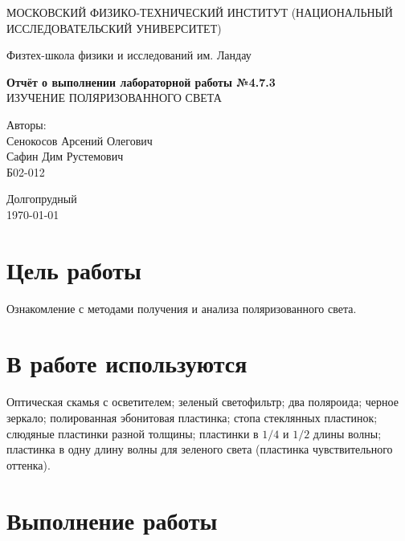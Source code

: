 \documentclass[a4paper,12pt]{article} %
\date{\today}
\begin{document}
\begin{titlepage}
	\begin{center}
		{\large МОСКОВСКИЙ ФИЗИКО-ТЕХНИЧЕСКИЙ ИНСТИТУТ (НАЦИОНАЛЬНЫЙ ИССЛЕДОВАТЕЛЬСКИЙ УНИВЕРСИТЕТ)}
	\end{center}
	\begin{center}
		{\large Физтех-школа физики и исследований им. Ландау}
	\end{center}
	
	
	\vspace{4.5cm}
	{\huge
		\begin{center}
			{\bf Отчёт о выполнении лабораторной работы №4.7.3}\\
			ИЗУЧЕНИЕ ПОЛЯРИЗОВАННОГО СВЕТА
		\end{center}
	}
	\vspace{2cm}
	\begin{flushright}
		{\LARGE Авторы:\\ Сенокосов Арсений Олегович \\ Сафин Дим Рустемович \\
			\vspace{0.2cm}
			Б02-012}
	\end{flushright}
	\vspace{8cm}
	\begin{center}
		Долгопрудный\\
		\today
	\end{center}
\end{titlepage}

\section{Цель работы}
Ознакомление с методами получения и анализа поляризованного света.

\section{В работе используются}
Оптическая скамья с осветителем; зеленый светофильтр; два поляроида; черное зеркало; полированная эбонитовая пластинка; стопа стеклянных пластинок; слюдяные пластинки разной толщины; пластинки в $ 1/4 $ и $ 1/2 $ длины волны; пластинка в одну длину волны для зеленого света (пластинка чувствительного оттенка).

\section{Выполнение работы}
\end{document}
